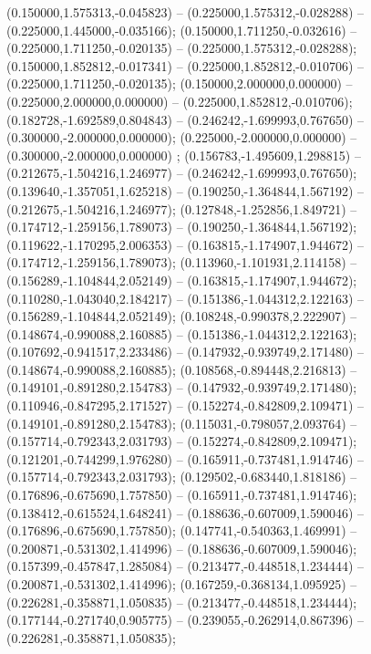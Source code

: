  (0.150000,1.575313,-0.045823) -- (0.225000,1.575312,-0.028288) -- (0.225000,1.445000,-0.035166);
 (0.150000,1.711250,-0.032616) -- (0.225000,1.711250,-0.020135) -- (0.225000,1.575312,-0.028288);
 (0.150000,1.852812,-0.017341) -- (0.225000,1.852812,-0.010706) -- (0.225000,1.711250,-0.020135);
 (0.150000,2.000000,0.000000) -- (0.225000,2.000000,0.000000) -- (0.225000,1.852812,-0.010706);
 (0.182728,-1.692589,0.804843) -- (0.246242,-1.699993,0.767650) -- (0.300000,-2.000000,0.000000);
 (0.225000,-2.000000,0.000000) -- (0.300000,-2.000000,0.000000) ;
 (0.156783,-1.495609,1.298815) -- (0.212675,-1.504216,1.246977) -- (0.246242,-1.699993,0.767650);
 (0.139640,-1.357051,1.625218) -- (0.190250,-1.364844,1.567192) -- (0.212675,-1.504216,1.246977);
 (0.127848,-1.252856,1.849721) -- (0.174712,-1.259156,1.789073) -- (0.190250,-1.364844,1.567192);
 (0.119622,-1.170295,2.006353) -- (0.163815,-1.174907,1.944672) -- (0.174712,-1.259156,1.789073);
 (0.113960,-1.101931,2.114158) -- (0.156289,-1.104844,2.052149) -- (0.163815,-1.174907,1.944672);
 (0.110280,-1.043040,2.184217) -- (0.151386,-1.044312,2.122163) -- (0.156289,-1.104844,2.052149);
 (0.108248,-0.990378,2.222907) -- (0.148674,-0.990088,2.160885) -- (0.151386,-1.044312,2.122163);
 (0.107692,-0.941517,2.233486) -- (0.147932,-0.939749,2.171480) -- (0.148674,-0.990088,2.160885);
 (0.108568,-0.894448,2.216813) -- (0.149101,-0.891280,2.154783) -- (0.147932,-0.939749,2.171480);
 (0.110946,-0.847295,2.171527) -- (0.152274,-0.842809,2.109471) -- (0.149101,-0.891280,2.154783);
 (0.115031,-0.798057,2.093764) -- (0.157714,-0.792343,2.031793) -- (0.152274,-0.842809,2.109471);
 (0.121201,-0.744299,1.976280) -- (0.165911,-0.737481,1.914746) -- (0.157714,-0.792343,2.031793);
 (0.129502,-0.683440,1.818186) -- (0.176896,-0.675690,1.757850) -- (0.165911,-0.737481,1.914746);
 (0.138412,-0.615524,1.648241) -- (0.188636,-0.607009,1.590046) -- (0.176896,-0.675690,1.757850);
 (0.147741,-0.540363,1.469991) -- (0.200871,-0.531302,1.414996) -- (0.188636,-0.607009,1.590046);
 (0.157399,-0.457847,1.285084) -- (0.213477,-0.448518,1.234444) -- (0.200871,-0.531302,1.414996);
 (0.167259,-0.368134,1.095925) -- (0.226281,-0.358871,1.050835) -- (0.213477,-0.448518,1.234444);
 (0.177144,-0.271740,0.905775) -- (0.239055,-0.262914,0.867396) -- (0.226281,-0.358871,1.050835);
